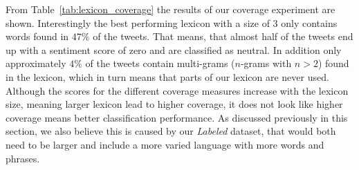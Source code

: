 From Table~\ref{tab:lexicon_coverage} the results of our coverage experiment are shown. Interestingly the best performing lexicon with a size of 3 only contains words found in $47\%$ of the tweets. That means, that almost half of the tweets end up with a sentiment score of zero and are classified as neutral. In addition only approximately $4\%$ of the tweets contain multi-grams ($n$-grams with $n>2$) found in the lexicon, which in turn means that parts of our lexicon are never used. Although the scores for the different coverage measures increase with the lexicon size, meaning larger lexicon lead to higher coverage, it does not look like higher coverage means better classification performance. As discussed previously in this section, we also believe this is caused by our \textit{Labeled} dataset, that would both need to be larger and include a more varied language with more words and phrases. \\

